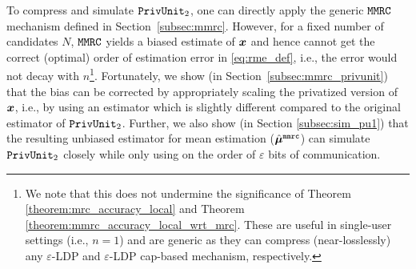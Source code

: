 To compress and simulate $\texttt{PrivUnit}_2$, one can directly apply the generic $\texttt{MMRC}$ mechanism defined in Section~\ref{subsec:mmrc}. However, for a fixed number of candidates $N$, $\texttt{MMRC}$ yields a biased estimate of ${\boldsymbol{x}}$ and hence cannot get the correct (optimal) order of estimation error in \eqref{eq:rme_def}, i.e., the error would not decay with $n$\footnote{We note that this does not undermine the significance of Theorem \ref{theorem:mrc_accuracy_local} and Theorem \ref{theorem:mmrc_accuracy_local_wrt_mrc}. These are useful in single-user settings (i.e., $n = 1$) and are generic as they can compress (near-losslessly) any $\varepsilon$-LDP and $\varepsilon$-LDP cap-based mechanism, respectively.}. Fortunately, we show (in Section~\ref{subsec:mmrc_privunit}) that the bias can be corrected by appropriately scaling the privatized version of ${\boldsymbol{x}}$, i.e., by using an estimator which is
slightly different compared to the original estimator of $\texttt{PrivUnit}_2$. Further, we also show (in Section \ref{subsec:sim_pu1}) that the resulting unbiased estimator for mean estimation ($\hat{{\boldsymbol{\mu}}}^{\texttt{mmrc}}$) can simulate $\texttt{PrivUnit}_2$ closely while only using on the order of $\varepsilon$ bits of communication.



